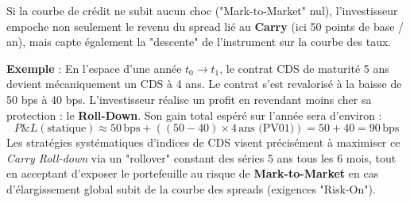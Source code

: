 Si la courbe de crédit ne subit aucun choc ("Mark-to-Market" nul), l'investisseur empoche non seulement le revenu du spread lié au \textbf{Carry} (ici 50 points de base / an), mais capte également la "descente" de l'instrument sur la courbe des taux. 

\textbf{Exemple} : En l'espace d'une année $t_0 \to t_1$, le contrat CDS de maturité 5 ans devient mécaniquement un CDS à 4 ans. 
Le contrat s'est revalorisé à la baisse de 50 bps à 40 bps. L'investisseur réalise un profit en revendant moins cher sa protection : le \textbf{Roll-Down}. Son gain total espéré sur l'année sera d'environ :
\begin{equation}
    P\&L(\text{statique}) \approx 50\,\text{bps} + \left( (50 - 40) \times 4\,\text{ans (PV01)} \right) = 50 + 40 = 90\,\text{bps}
\end{equation}
Les stratégies systématiques d'indices de CDS visent précisément à maximiser ce \textit{Carry Roll-down} via un "rollover" constant des séries 5 ans tous les 6 mois, tout en acceptant d'exposer le portefeuille au risque de \textbf{Mark-to-Market} en cas d'élargissement global subit de la courbe des spreads (exigences "Risk-On").
